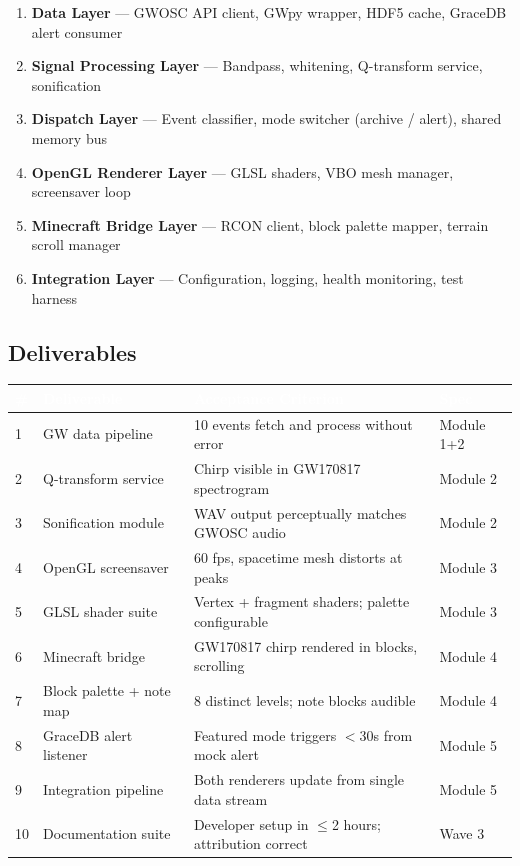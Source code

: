 \documentclass[11pt,letterpaper]{article}
\newcommand{\tableheader}[1]{\textbf{\sffamily\textcolor{white}{#1}}}
\begin{document}
\begin{enumerate}
  \item \textbf{Data Layer} --- GWOSC API client, GWpy wrapper, HDF5 cache, GraceDB alert consumer
  \item \textbf{Signal Processing Layer} --- Bandpass, whitening, Q-transform service, sonification
  \item \textbf{Dispatch Layer} --- Event classifier, mode switcher (archive / alert), shared memory bus
  \item \textbf{OpenGL Renderer Layer} --- GLSL shaders, VBO mesh manager, screensaver loop
  \item \textbf{Minecraft Bridge Layer} --- RCON client, block palette mapper, terrain scroll manager
  \item \textbf{Integration Layer} --- Configuration, logging, health monitoring, test harness
\end{enumerate}

\subsection{Deliverables}

\begin{center}
\begin{tabularx}{\textwidth}{C{0.5cm}L{3.5cm}L{3.5cm}X}
\toprule
{}
\tableheader{\#} & \tableheader{Deliverable} & \tableheader{Acceptance Criterion} & \tableheader{Spec} \\
 & GW data pipeline & 10 events fetch and process without error & Module 1+2 \\
2 & Q-transform service & Chirp visible in GW170817 spectrogram & Module 2 \\
3 & Sonification module & WAV output perceptually matches GWOSC audio & Module 2 \\
4 & OpenGL screensaver & 60 fps, spacetime mesh distorts at peaks & Module 3 \\
5 & GLSL shader suite & Vertex + fragment shaders; palette configurable & Module 3 \\
6 & Minecraft bridge & GW170817 chirp rendered in blocks, scrolling & Module 4 \\
7 & Block palette + note map & 8 distinct levels; note blocks audible & Module 4 \\
8 & GraceDB alert listener & Featured mode triggers $<$30s from mock alert & Module 5 \\
9 & Integration pipeline & Both renderers update from single data stream & Module 5 \\
10 & Documentation suite & Developer setup in $\leq$2 hours; attribution correct & Wave 3 \\
\bottomrule
\end{tabularx}
\end{center}
\end{document}
